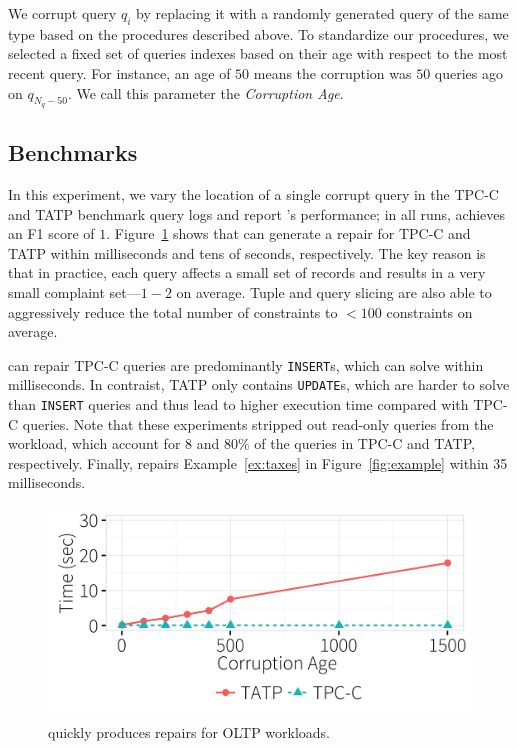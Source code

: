  We corrupt query $q_i$ by replacing it with a randomly
generated query of the same type based on the procedures described above.
To standardize our procedures, we selected a fixed set of queries indexes based on their age with respect to the most recent query.
For instance, an age of $50$ means the corruption was $50$ queries ago on $q_{N_q-50}$.
We call this parameter the {\it Corruption Age}.



\subsection{Benchmarks}
\label{sec:experiments:benchmark}
In this experiment, we vary the location of a single corrupt query in the TPC-C and TATP benchmark query logs and report \sys's performance;
in all runs, \sys achieves an F1 score of $1$.
Figure~\ref{f:tpcctatp} shows that \sys can generate a repair for TPC-C and TATP within milliseconds and tens of seconds, respectively.
The key reason is that in practice, each query affects a small set of records and results in a very small complaint set---$1-2$ on average.
Tuple and query slicing are also able to aggressively reduce the total number of constraints to $<100$ constraints on average.

\sys can repair TPC-C  queries are predominantly \texttt{INSERT}s, which \sys can solve within milliseconds. 
In contraist, TATP only contains \texttt{UPDATE}s, which are harder to solve than \texttt{INSERT} queries and thus lead to higher execution time compared with TPC-C queries.
Note that these experiments stripped out read-only queries from the workload, which account for $8$ and $80\%$ of the queries in TPC-C and TATP, respectively.
Finally, \sys repairs Example~\ref{ex:taxes} in Figure~\ref{fig:example} within 35 milliseconds. 

\begin{figure}[h]
\centering
  \includegraphics[width = .75\columnwidth]{figures/benchmark_time}
  \vspace*{-.2in}
  \caption{\sys quickly produces repairs for OLTP workloads.}
  \label{f:tpcctatp} 
\end{figure}

